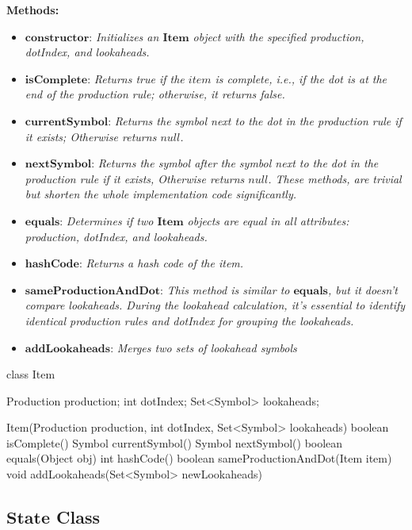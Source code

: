 \textbf{Methods:}
\begin{itemize}
    \item \(\boldsymbol{constructor}\): \textit{Initializes an \(\boldsymbol{Item}\) object with the specified production, dotIndex, and lookaheads.}
    \item \(\boldsymbol{isComplete}\): \textit{Returns true if the \(item\) is complete, i.e., if the dot is at the end of the production rule; otherwise, it returns false.}
    \item \(\boldsymbol{currentSymbol}\): \textit{Returns the symbol next to the dot in the production rule if it exists; Otherwise returns \(null\).}
    \item \(\boldsymbol{nextSymbol}\): \textit{Returns the symbol after the symbol next to the dot in the production rule if it exists, Otherwise returns \(null\). These methods, are trivial but shorten the whole implementation code significantly.}
    \item \(\boldsymbol{equals}\): \textit{Determines if two \(\boldsymbol{Item}\) objects are equal in all attributes: production, dotIndex, and lookaheads.}
    \item \(\boldsymbol{hashCode}\): \textit{Returns a hash code of the item.}
    \item \(\boldsymbol{sameProductionAndDot}\): \textit{This method is similar to \(\boldsymbol{equals}\), but it doesn't compare lookaheads. During the lookahead calculation, it's essential to identify identical production rules and dotIndex for grouping the lookaheads.}
    \item \(\boldsymbol{addLookaheads}\): \textit{Merges two sets of lookahead symbols}
\end{itemize}

\begin{codeblock}
    class Item {
        Production production;
        int dotIndex;
        Set<Symbol> lookaheads;

        Item(Production production, int dotIndex, Set<Symbol> lookaheads) {}
        boolean isComplete() {}
        Symbol currentSymbol() {}
        Symbol nextSymbol(){}
        boolean equals(Object obj) {}
        int hashCode() {}
        boolean sameProductionAndDot(Item item) {}
        void addLookaheads(Set<Symbol> newLookaheads) {}
    }
\end{codeblock}

\vspace{10pt}

\subsection{\(\boldsymbol{State}\) Class}

